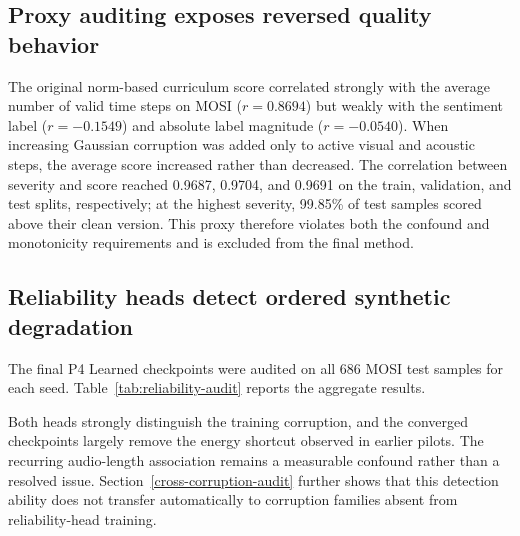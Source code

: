 \subsection{Proxy auditing exposes reversed quality
behavior}\label{proxy-auditing-exposes-reversed-quality-behavior}

The original norm-based curriculum score correlated strongly with the
average number of valid time steps on MOSI (\(r=0.8694\)) but weakly
with the sentiment label (\(r=-0.1549\)) and absolute label magnitude
(\(r=-0.0540\)). When increasing Gaussian corruption was added only to
active visual and acoustic steps, the average score increased rather
than decreased. The correlation between severity and score reached
0.9687, 0.9704, and 0.9691 on the train, validation, and test splits,
respectively; at the highest severity, 99.85\% of test samples scored
above their clean version. This proxy therefore violates both the
confound and monotonicity requirements and is excluded from the final
method.

\subsection{Reliability heads detect ordered synthetic
degradation}\label{reliability-heads-detect-ordered-synthetic-degradation}

The final P4 Learned checkpoints were audited on all 686 MOSI test
samples for each seed. Table~\ref{tab:reliability-audit} reports the
aggregate results.

\begin{table}[t]
\caption{Reliability audit on the frozen P4 Learned MOSI checkpoints
(mean $\pm$ sample standard deviation over three seeds). More negative
Spearman and higher AUROC indicate better degradation tracking.}
\label{tab:reliability-audit}
\centering
{}
\end{table}

Both heads strongly distinguish the training corruption, and the converged
checkpoints largely remove the energy shortcut observed in earlier
pilots. The recurring audio-length association remains a measurable
confound rather than a resolved issue. Section~\ref{cross-corruption-audit}
further shows that this detection ability does not transfer automatically to
corruption families absent from reliability-head training.


